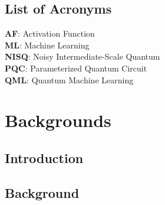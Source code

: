 \documentclass[12pt]{report}
\begin{document}
\chapter*{List of Acronyms}
\noindent\textbf{AF}: Activation Function
\\
\noindent\textbf{ML}: Machine Learning
\\
\noindent\textbf{NISQ}: Noisy Intermediate-Scale Quantum
\\
\noindent\textbf{PQC}: Parameterized Quantum Circuit
\\
\noindent\textbf{QML}: Quantum Machine Learning

\clearpage

\part{Backgrounds}\label{part-bkg}

\chapter{Introduction}\label{c:intro}



\chapter{Background}
\end{document}
